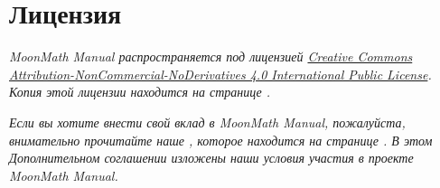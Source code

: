 \chapter*{Лицензия}
\itshape{}
MoonMath Manual распространяется под лицензией \href{https://creativecommons.org/licenses/by-nc-nd/4.0/}{Creative Commons Attribution-NonCommercial-NoDerivatives 4.0 International Public License}. Копия этой лицензии находится на странице \pageref{chapter:license}.

\textit{Если вы хотите внести свой вклад в MoonMath Manual, пожалуйста, внимательно прочитайте наше , которое находится на странице \pageref{sideletter}. В этом Дополнительном соглашении изложены наши условия участия в проекте MoonMath Manual.}

\upshape{}

